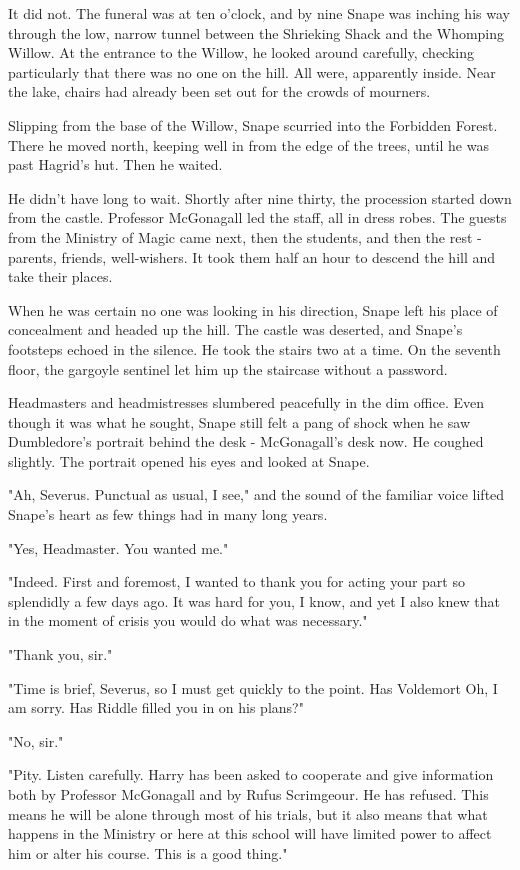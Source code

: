 It did not. The funeral was at ten o'clock, and by nine Snape was inching his way through the low, narrow tunnel between the Shrieking Shack and the Whomping Willow. At the entrance to the Willow, he looked around carefully, checking particularly that there was no one on the hill. All were, apparently inside. Near the lake, chairs had already been set out for the crowds of mourners.

Slipping from the base of the Willow, Snape scurried into the Forbidden Forest. There he moved north, keeping well in from the edge of the trees, until he was past Hagrid's hut. Then he waited.

He didn't have long to wait. Shortly after nine thirty, the procession started down from the castle. Professor McGonagall led the staff, all in dress robes. The guests from the Ministry of Magic came next, then the students, and then the rest - parents, friends, well-wishers. It took them half an hour to descend the hill and take their places.

When he was certain no one was looking in his direction, Snape left his place of concealment and headed up the hill. The castle was deserted, and Snape's footsteps echoed in the silence. He took the stairs two at a time. On the seventh floor, the gargoyle sentinel let him up the staircase without a password.

Headmasters and headmistresses slumbered peacefully in the dim office. Even though it was what he sought, Snape still felt a pang of shock when he saw Dumbledore's portrait behind the desk - McGonagall's desk now. He coughed slightly. The portrait opened his eyes and looked at Snape.

"Ah, Severus. Punctual as usual, I see," and the sound of the familiar voice lifted Snape's heart as few things had in many long years.

"Yes, Headmaster. You wanted me."

"Indeed. First and foremost, I wanted to thank you for acting your part so splendidly a few days ago. It was hard for you, I know, and yet I also knew that in the moment of crisis you would do what was necessary."

"Thank you, sir."

"Time is brief, Severus, so I must get quickly to the point. Has Voldemort{\el} Oh, I am sorry. Has Riddle filled you in on his plans?"

"No, sir."

"Pity. Listen carefully. Harry has been asked to cooperate and give information both by Professor McGonagall and by Rufus Scrimgeour. He has refused. This means he will be alone through most of his trials, but it also means that what happens in the Ministry or here at this school will have limited power to affect him or alter his course. This is a good thing."

